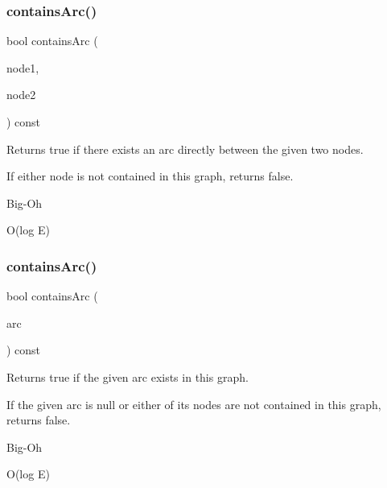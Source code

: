 \subsubsection{\texorpdfstring{contains\+Arc()}{containsArc()}\hspace{0.1cm}{\footnotesize\ttfamily [2/3]}}
{\footnotesize\ttfamily bool contains\+Arc (\begin{DoxyParamCaption}\item[{const std\+::string \&}]{node1,  }\item[{const std\+::string \&}]{node2 }\end{DoxyParamCaption}) const\hspace{0.3cm}{\ttfamily [inherited]}}



Returns true if there exists an arc directly between the given two nodes. 

If either node is not contained in this graph, returns false. \begin{DoxyRefDesc}{Big-\/\+Oh}
\item[\mbox{\hyperlink{BigOh__BigOh000054}{Big-\/\+Oh}}]O(log E) \end{DoxyRefDesc}
\mbox{\label{classGraph_acf7a659ddd8a143836b91b01c200ee8a}} 
\subsubsection{\texorpdfstring{contains\+Arc()}{containsArc()}\hspace{0.1cm}{\footnotesize\ttfamily [3/3]}}
{\footnotesize\ttfamily bool contains\+Arc (\begin{DoxyParamCaption}\item[{Edge\+Gen$<$ V, E $>$  $\ast$}]{arc }\end{DoxyParamCaption}) const\hspace{0.3cm}{\ttfamily [inherited]}}



Returns true if the given arc exists in this graph. 

If the given arc is null or either of its nodes are not contained in this graph, returns false. \begin{DoxyRefDesc}{Big-\/\+Oh}
\item[\mbox{\hyperlink{BigOh__BigOh000055}{Big-\/\+Oh}}]O(log E) \end{DoxyRefDesc}
\mbox{\label{classBasicGraphGen_a6ce3804a90bf7006e7bc78e1a51a1365}} 
